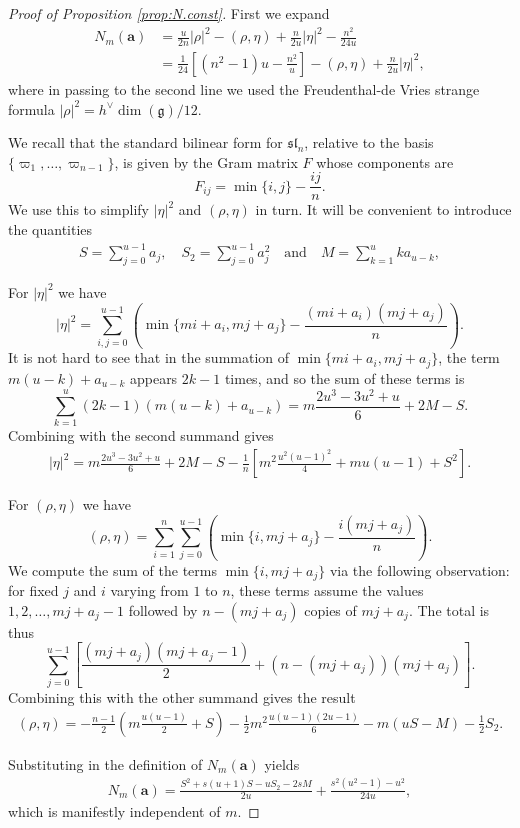 \documentclass[12pt]{amsart}
\theoremstyle{plain}
\theoremstyle{definition}
\numberwithin{equation}{section}
\newcommand{\g}{\mathfrak{g}}
\newcommand{\sll}{\mathfrak{sl}}
\begin{document}
\begin{proof}[Proof of Proposition \ref{prop:N.const}]
First we expand
\begin{align*}
N_m(\mathbf{a}) &= \frac{u}{2n} |\rho|^2 - (\rho, \eta) + \frac{n}{2u}|\eta|^2 - \frac{n^2}{24u} \\
%
&= \frac{1}{24}\left[(n^2-1)u - \frac{n^2}{u}\right] - (\rho, \eta) + \frac{n}{2u}|\eta|^2,
\end{align*}
where in passing to the second line we used the Freudenthal-de Vries strange formula $|\rho|^2 = h^\vee \dim(\g) / 12$.

We recall that the standard bilinear form for $\sll_n$, relative to the basis $\{\varpi_1, \ldots, \varpi_{n-1}\}$, is given by the Gram matrix $F$ whose components are
\[
F_{ij} = \min\{i, j\} - \frac{ij}{n}.
\]
We use this to simplify $|\eta|^2$ and $(\rho, \eta)$ in turn. It will be convenient to introduce the quantities
\begin{align*}
S = \sum_{j=0}^{u-1} a_j, \quad S_2 = \sum_{j=0}^{u-1} a_j^2 \quad \text{and} \quad M = \sum_{k=1}^{u} k a_{u-k},
\end{align*}

For $|\eta|^2$ we have
\[
|\eta|^2 = \sum_{i, j=0}^{u-1} \left( \min\{mi+a_i, mj+a_j\} - \frac{(mi+a_i)(mj+a_j)}{n} \right).
\]
It is not hard to see that in the summation of $\min\{mi+a_i, mj+a_j\}$, the term $m(u-k)+a_{u-k}$ appears $2k-1$ times, and so the sum of these terms is
\[
\sum_{k=1}^u (2k-1) (m(u-k) + a_{u-k}) = m \frac{2u^3-3u^2+u}{6} + 2M - S.
\]
Combining with the second summand gives
\begin{align*}
|\eta|^2 = m \frac{2u^3-3u^2+u}{6} + 2M - S - \frac{1}{n}\left[m^2\frac{u^2(u-1)^2}{4} + mu(u-1) + S^2\right].
\end{align*}

For $(\rho, \eta)$ we have
\[
(\rho, \eta) = \sum_{i=1}^n \sum_{j=0}^{u-1} \left( \min\{i, mj+a_j\} - \frac{i(mj+a_j)}{n} \right).
\]
We compute the sum of the terms $\min\{i, mj+a_j\}$ via the following observation: for fixed $j$ and $i$ varying from $1$ to $n$, these terms assume the values $1, 2, \ldots, mj+a_j-1$ followed by $n-(mj+a_j)$ copies of $mj+a_j$. The total is thus
\[
\sum_{j=0}^{u-1} \left[ \frac{(mj+a_j)(mj+a_j-1)}{2} + (n - (mj + a_j))(mj+a_j) \right].
\]
Combining this with the other summand gives the result
\begin{align*}
(\rho, \eta) = -\frac{n-1}{2}\left(m \frac{u(u-1)}{2} + S\right) - \frac{1}{2}m^2 \frac{u(u-1)(2u-1)}{6} - m(uS-M) - \frac{1}{2}S_2.
\end{align*}

Substituting in the definition of $N_m(\mathbf{a})$ yields
\begin{align*}
N_m(\mathbf{a}) = \frac{S^2 + s(u+1)S - uS_2 - 2sM}{2 u} + \frac{s^2 \left(u^2-1\right)-u^2}{24 u},
\end{align*}
which is manifestly independent of $m$.
\end{proof}
\end{document}
